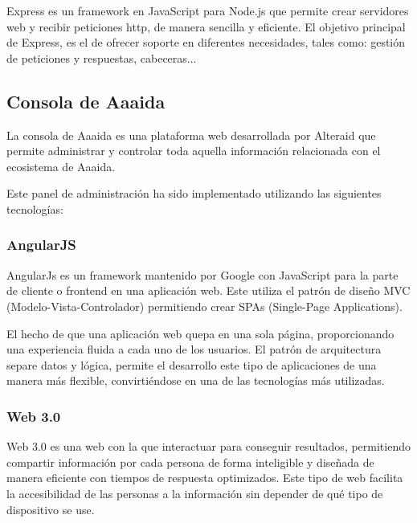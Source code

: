 Express es un framework en JavaScript para Node.js que permite crear
servidores web y recibir peticiones http, de manera sencilla y eficiente.
El objetivo principal de Express, es el de ofrecer soporte en diferentes
necesidades, tales como: gestión de peticiones y respuestas, cabeceras...

\subsection{Consola de Aaaida}

La consola de Aaaida es una plataforma web desarrollada por Alteraid que permite administrar y controlar toda aquella información relacionada con el ecosistema de Aaaida.

Este panel de administración ha sido implementado utilizando las siguientes
tecnologías:

\subsubsection{AngularJS}

AngularJs es un framework mantenido por Google con JavaScript para la parte de cliente o frontend en una aplicación web. Este utiliza el patrón de diseño MVC (Modelo-Vista-Controlador) permitiendo crear SPAs (Single-Page Applications).

El hecho de que una aplicación web quepa en una sola página, proporcionando una experiencia fluida a cada uno de los usuarios. El patrón de arquitectura separe datos y lógica, permite el desarrollo este tipo de aplicaciones de una manera más flexible, convirtiéndose en una de las tecnologías más
utilizadas.

\subsubsection{Web 3.0}

Web 3.0 es una web con la que interactuar para conseguir resultados, permitiendo compartir información por cada persona de forma inteligible y diseñada de manera eficiente con tiempos de respuesta optimizados. Este tipo de web facilita la accesibilidad de las personas a la información sin depender de qué tipo de dispositivo se use.